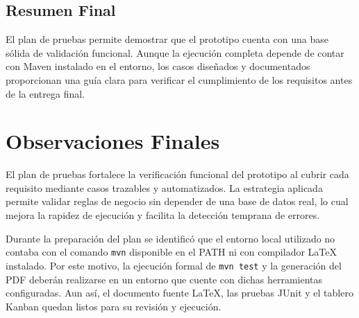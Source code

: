 \documentclass[12pt,a4paper]{article}
\begin{document}
\subsection{Resumen Final}

El plan de pruebas permite demostrar que el prototipo cuenta con una base sólida de validación funcional. Aunque la ejecución completa depende de contar con Maven instalado en el entorno, los casos diseñados y documentados proporcionan una guía clara para verificar el cumplimiento de los requisitos antes de la entrega final.

\section{Observaciones Finales}

El plan de pruebas fortalece la verificación funcional del prototipo al cubrir cada requisito mediante casos trazables y automatizados. La estrategia aplicada permite validar reglas de negocio sin depender de una base de datos real, lo cual mejora la rapidez de ejecución y facilita la detección temprana de errores.

Durante la preparación del plan se identificó que el entorno local utilizado no contaba con el comando \texttt{mvn} disponible en el PATH ni con compilador LaTeX instalado. Por este motivo, la ejecución formal de \texttt{mvn test} y la generación del PDF deberán realizarse en un entorno que cuente con dichas herramientas configuradas. Aun así, el documento fuente LaTeX, las pruebas JUnit y el tablero Kanban quedan listos para su revisión y ejecución.
\end{document}

